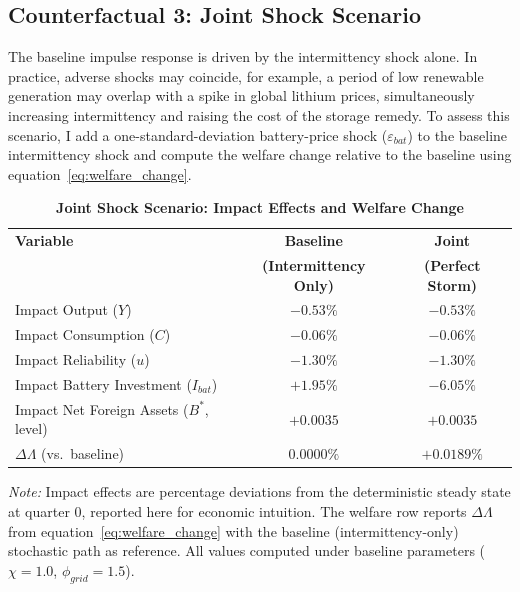 	\subsection{Counterfactual 3: Joint Shock Scenario} \label{subsec:joint_shock}

	The baseline impulse response is driven by the intermittency shock alone. In practice, adverse shocks may coincide, for example, a period of low renewable generation may overlap with a spike in global lithium prices, simultaneously increasing intermittency and raising the cost of the storage remedy. To assess this scenario, I add a one-standard-deviation battery-price shock ($\varepsilon_{bat}$) to the baseline intermittency shock and compute the welfare change relative to the baseline using equation~\eqref{eq:welfare_change}.

	\begin{table}[H]
		\centering
		\caption[Joint Shock Scenario: Impact Effects and Welfare Change]{\textbf{Joint Shock Scenario: Impact Effects and Welfare Change}}
		\label{tab:joint_shock}
		\renewcommand{\arraystretch}{1.3}
		\begin{tabular}{l c c}
			\toprule
			\textbf{Variable} & \textbf{Baseline} & \textbf{Joint} \\
			& \textbf{(Intermittency Only)} & \textbf{(Perfect Storm)} \\
			\midrule
			Impact Output ($Y$) & $-0.53\%$ & $-0.53\%$ \\
			Impact Consumption ($C$) & $-0.06\%$ & $-0.06\%$ \\
			Impact Reliability ($u$) & $-1.30\%$ & $-1.30\%$ \\
			Impact Battery Investment ($I_{bat}$) & $+1.95\%$ & $-6.05\%$ \\
			Impact Net Foreign Assets ($B^*$, level) & $+0.0035$ & $+0.0035$ \\
			\midrule
			$\Delta\Lambda$ (vs.\ baseline) & $0.0000\%$ & $+0.0189\%$ \\
			\bottomrule
		\end{tabular}
		\vspace{0.2cm}
		\parbox{\textwidth}{\footnotesize \textit{Note:} Impact effects are percentage deviations from the deterministic steady state at quarter $0$, reported here for economic intuition. The welfare row reports $\Delta\Lambda$ from equation~\eqref{eq:welfare_change} with the baseline (intermittency-only) stochastic path as reference. All values computed under baseline parameters ($\chi = 1.0$, $\phi_{grid} = 1.5$).}
	\end{table}

